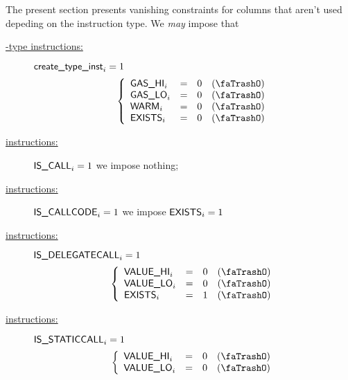 The present section presents vanishing constraints for columns that aren't used depeding on the instruction type. We \emph{may} impose that
\begin{description}
	\item[\underline{-type instructions:}] \If $\textsf{create\_type\_inst}_{i} = 1$ \Then
		\[
			\left\{\begin{array}{lclr}
				\gasHi_{i}        & = & 0 & (\trash) \\
				\gasLo_{i}        & = & 0 & (\trash) \\
				\warm_{i}         & = & 0 & (\trash) \\
				\existence_{i}    & = & 0 & (\trash) \\
			\end{array}\right.
		\]
	\item[\underline{ instructions:}] \If $\textsf{IS\_CALL}_{i} = 1$ \Then we impose nothing;
	\item[\underline{ instructions:}] \If $\textsf{IS\_CALLCODE}_{i} = 1$ \Then we impose \( \textsf{EXISTS}_{i} = 1 \)
	\item[\underline{ instructions:}] \If $\textsf{IS\_DELEGATECALL}_{i} = 1$ \Then
		\[
			\left\{\begin{array}{lclr}
				\valHi_{i}        & = & 0 & (\trash) \\
				\valLo_{i}        & = & 0 & (\trash) \\
				\existence_{i}    & = & 1 & (\trash) \\
			\end{array}\right.
		\]
	\item[\underline{ instructions:}] \If $\textsf{IS\_STATICCALL}_{i} = 1$ \Then
		\[
			\left\{\begin{array}{lclr}
				\valHi_{i}        & = & 0 & (\trash) \\
				\valLo_{i}        & = & 0 & (\trash) \\
			\end{array}\right.
		\]
\end{description}

